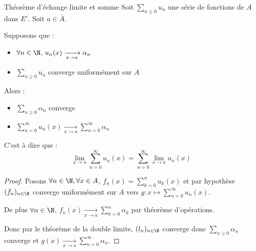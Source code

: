\begin{theoreme}{Théorème d'échange limite et somme}{}
    Soit $\sum_{n \geqslant 0 } u_n$ une série de fonctions de $A$ dans $E'$. Soit $a \in \bar A$. 

    Supposons que :
    \begin{itemize}
        \item $\forall n \in \N, \, u_n(x) \xrightarrow[x \to a]{} \alpha_n$
        \item $\sum_{n \geqslant 0} u_n$ converge uniformément sur $A$
    \end{itemize}
    Alors : 
    \begin{itemize}
        \item $\displaystyle \sum_{n \geqslant 0} \alpha_n$ converge
        \item $ \displaystyle \sum_{n = 0 }^{\infty    } u_n(x) \xrightarrow[x \to a]{} \sum_{n = 0}^{\infty} \alpha_n$
    \end{itemize} 

    C'est à dire que :
    $$\lim_{x \to a} \sum_{n = 0}^{\infty} u_n(x) = \sum_{n = 0}^{\infty} \lim_{x \to a} u_n(x)$$
\end{theoreme}


\begin{proof}
    Posons $\forall n \in \N, \forall x \in A$, $\displaystyle f_n(x) = \sum_{k = 0}^n u_k(x)$ et par hypothèse 
    $(f_n)_{n \in \N}$ converge uniformément sur $A$ vers $\displaystyle g : x \mapsto \sum_{n = 0}^{\infty} u_n(x)$.

    De plus $\displaystyle \forall n \in \N$, $\displaystyle f_n(x) \xrightarrow[x \to a]{} \sum_{k = 0}^n \alpha_k$ par théorème d'opérations. 

    Donc par le théorème de la double limite, $(l_n)_{n \in \N}$ converge donc $\displaystyle \sum_{n \geqslant 0} \alpha_n$ converge et 
    $\displaystyle g(x) \xrightarrow[x \to a]{} \sum_{n = 0}^{\infty} \alpha_n$.
\end{proof}

